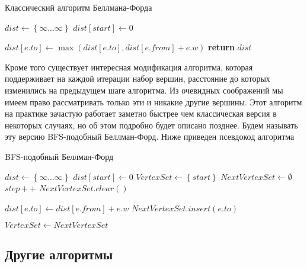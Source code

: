 \FloatBarrier
\begin{algorithm}
\caption{Классический алгоритм Беллмана-Форда}\label{bf_classic_seq}
\begin{algorithmic}[1]
\State $dist\gets \left\{ {\infty ... \infty}\right\}$
\State $dist[start] \gets 0$
 
		\State $dist[e.to] \gets \max(dist[e.to], dist[e.from] + e.w)$
	\EndFor
\EndFor
\State \textbf{return} $dist$
\EndProcedure
\end{algorithmic}
\end{algorithm}

\FloatBarrier
Кроме того существует интересная модификация алгоритма, которая поддерживает на каждой итерации набор вершин, расстояние до которых изменились на предыдущем шаге алгоритма. Из очевидных соображений мы имеем право рассматривать только эти и никакие другие вершины. Этот алгоритм на практике зачастую работает заметно быстрее чем классическая версия в некоторых случаях, но об этом подробно будет описано позднее. Будем называть эту версию BFS-подобный Беллман-Форд. Ниже приведен псевдокод алгоритма 

\FloatBarrier
\begin{algorithm}
\caption{BFS-подобный Беллман-Форд}\label{bf_classic_seq}
\begin{algorithmic}[1]
\State $dist\gets \left\{ {\infty ... \infty}\right\}$
\State $dist[start] \gets 0$
\State $VertexSet \gets \left\{ {start}\right\}$ 
\State $NextVertexSet \gets \emptyset$ 
	\State $step++$
	\State $NextVertexSet.clear()$
	
		  
				\State $dist[e.to] \gets dist[e.from] + e.w$
				\State $NextVertexSet.insert(e.to)$								
			\EndIf
		\EndFor
	\EndFor
	
	\State $VertexSet \gets NextVertexSet$	
\EndWhile

\EndProcedure
\end{algorithmic}
\end{algorithm}

\FloatBarrier
\subsection{Другие алгоритмы}


